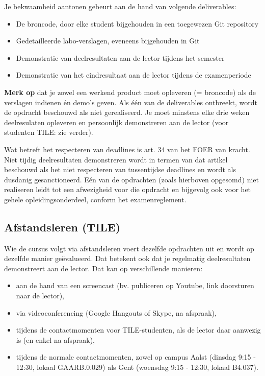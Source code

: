 Je bekwaamheid aantonen gebeurt aan de hand van volgende deliverables:

\begin{itemize}
\item
  De broncode, door elke student bijgehouden in een toegewezen Git
  repository
\item
  Gedetailleerde labo-verslagen, eveneens bijgehouden in Git
\item
  Demonstratie van deelresultaten aan de lector tijdens het semester
\item
  Demonstratie van het eindresultaat aan de lector tijdens de
  examenperiode
\end{itemize}

\textbf{Merk op} dat je zowel een werkend product moet opleveren (= broncode) als de verslagen indienen én demo's geven. Als één van de deliverables ontbreekt, wordt de opdracht beschouwd als niet gerealiseerd. Je moet minstens elke drie weken deelresulaten opleveren en persoonlijk demonstreren aan de lector (voor studenten TILE: zie verder).

Wat betreft het respecteren van deadlines is art. 34 van het FOER van kracht. Niet tijdig deelresultaten demonstreren wordt in termen van dat artikel beschouwd als het niet respecteren van tussentijdse deadlines en wordt als dusdanig gesanctioneerd. Eén van de opdrachten (zoals hierboven opgesomd) niet realiseren leidt tot een afwezigheid voor die opdracht en bijgevolg ook voor het gehele opleidingsonderdeel, conform het examenreglement.

\subsection{Afstandsleren (TILE)}
\label{afstandsleren-tile}

Wie de cursus volgt via afstandsleren voert dezelfde opdrachten uit en
wordt op dezelfde manier geëvalueerd. Dat betekent ook dat je regelmatig
deelresultaten demonstreert aan de lector. Dat kan op verschillende
manieren:

\begin{itemize}
\item aan de hand van een screencast (bv. publiceren op Youtube, link doorsturen naar de lector),
\item via videoconferencing (Google Hangouts of Skype, na afspraak),
\item tijdens de contactmomenten voor TILE-studenten, als de lector daar aanwezig is (en enkel na afspraak),
\item tijdens de normale contactmomenten, zowel op campus Aalst (dinsdag 9:15 - 12:30, lokaal GAARB.0.029) als Gent (woensdag 9:15 - 12:30, lokaal B4.037).
\end{itemize}

